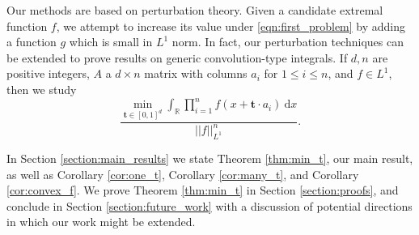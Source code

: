 \documentclass[11pt,reqno]{amsart}
\newcommand{\fix}[1]{\textcolor{red}{\textbf{ (#1)\normalsize}}}
\numberwithin{equation}{section}
\theoremstyle{plain}
\newcommand{\R}{\ensuremath{\mathbb{R}}}
\begin{document}
Our methods are based on perturbation theory. Given a candidate extremal function $f$, we attempt to increase its value under \eqref{eqn:first_problem} by adding a function $g$ which is small in $L^1$ norm. In fact, our perturbation techniques can be extended to prove results on generic convolution-type integrals. If $d, n$ are positive integers, $A$ a $d \times n$ matrix with columns $a_i$ for $1 \leq i \leq n$, and $f \in L^1$, then we study
\begin{equation}\label{eqn:min_t}
    \displaystyle\frac{\min\limits_{\mathbf{t}\in[0,1]^d}\displaystyle\int_{\R} \prod\limits_{i=1}^{n}f(x+\mathbf{t}\cdot a_i)\ \mathrm{d}x}{||f||_{L^1}^{n}}.
\end{equation}



In Section \ref{section:main_results} we state Theorem \ref{thm:min_t}, our main result, as well as Corollary \ref{cor:one_t}, Corollary \ref{cor:many_t}, and Corollary \ref{cor:convex_f}. We prove Theorem \ref{thm:min_t} in Section \ref{section:proofs}, and conclude in Section \ref{section:future_work} with a discussion of potential directions in which our work might be extended.
\end{document}
